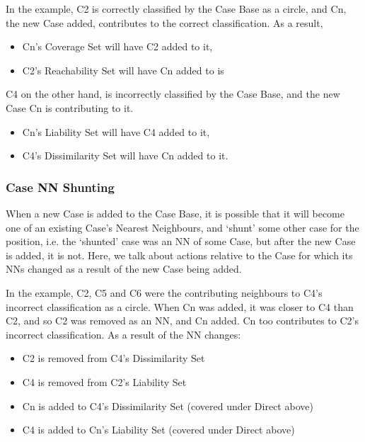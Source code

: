 \documentclass[a4paper,11pt]{report}
\begin{document}
In the example, C2 is correctly classified by the Case Base as a circle, and Cn, the new Case added, contributes to the correct classification. As a result,
\begin{itemize}
	\item Cn's Coverage Set will have C2 added to it, 
	\item C2's Reachability Set will have Cn added to is
\end{itemize}

C4 on the other hand, is incorrectly classified by the Case Base, and the new Case Cn is contributing to it.
\begin{itemize}
	\item Cn's Liability Set will have C4 added to it,
	\item C4's Dissimilarity Set will have Cn added to it.
\end{itemize}

\subsubsection{Case NN Shunting}
When a new Case is added to the Case Base, it is possible that it will become one of an existing Case's Nearest Neighbours, and `shunt' some other case for the position, i.e. the `shunted' case was an NN of some Case, but after the new Case is added, it is not. Here, we talk about actions relative to the Case for which its NNs changed as a result of the new Case being added.

In the example, C2, C5 and C6 were the contributing neighbours to C4's incorrect classification as a circle. When Cn was added, it was closer to C4 than C2, and so C2 was removed as an NN, and Cn added. Cn too contributes to C2's incorrect classification.  As a result of the NN changes: 
\begin{itemize}
	\item C2 is removed from C4's Dissimilarity Set  
	\item C4 is removed from C2's Liability Set
	\item Cn is added to C4's Dissimilarity Set  (covered under Direct above)
	\item C4 is added to Cn's Liability Set (covered under Direct above)
\end{itemize}
\end{document}
